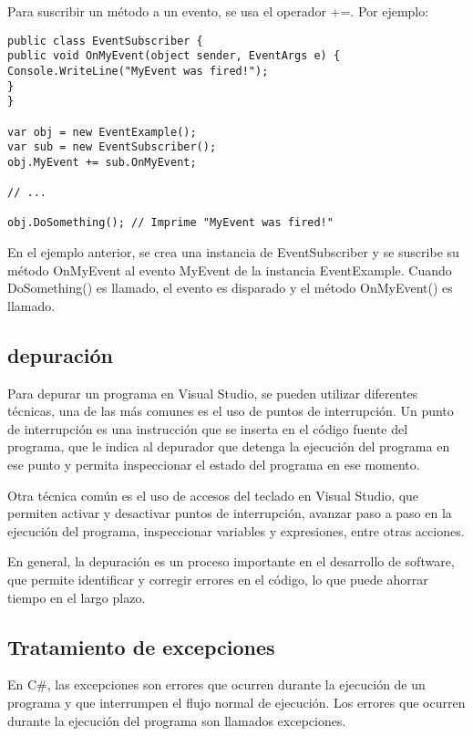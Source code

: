 \documentclass[executivepaper]{article}
\begin{document}
Para suscribir un método a un evento, se usa el operador +=. Por ejemplo:

\begin{lstlisting}[language={[Sharp]C}]
public class EventSubscriber {
public void OnMyEvent(object sender, EventArgs e) {
Console.WriteLine("MyEvent was fired!");
}
}

var obj = new EventExample();
var sub = new EventSubscriber();
obj.MyEvent += sub.OnMyEvent;

// ...

obj.DoSomething(); // Imprime "MyEvent was fired!"
\end{lstlisting}

En el ejemplo anterior, se crea una instancia de EventSubscriber y se suscribe su método OnMyEvent al evento MyEvent de la instancia EventExample. Cuando DoSomething() es llamado, el evento es disparado y el método OnMyEvent() es llamado.

\subsection*{depuración}

Para depurar un programa en Visual Studio, se pueden utilizar diferentes técnicas, una de las más comunes es el uso de puntos de interrupción. Un punto de interrupción es una instrucción que se inserta en el código fuente del programa, que le indica al depurador que detenga la ejecución del programa en ese punto y permita inspeccionar el estado del programa en ese momento.

Otra técnica común es el uso de accesos del teclado en Visual Studio, que permiten activar y desactivar puntos de interrupción, avanzar paso a paso en la ejecución del programa, inspeccionar variables y expresiones, entre otras acciones.

En general, la depuración es un proceso importante en el desarrollo de software, que permite identificar y corregir errores en el código, lo que puede ahorrar tiempo en el largo plazo.

\subsection{Tratamiento de excepciones}

En C\#, las excepciones son errores que ocurren durante la ejecución de un programa y que interrumpen el flujo normal de ejecución. Los errores que ocurren durante la ejecución del programa son llamados excepciones.
\end{document}
